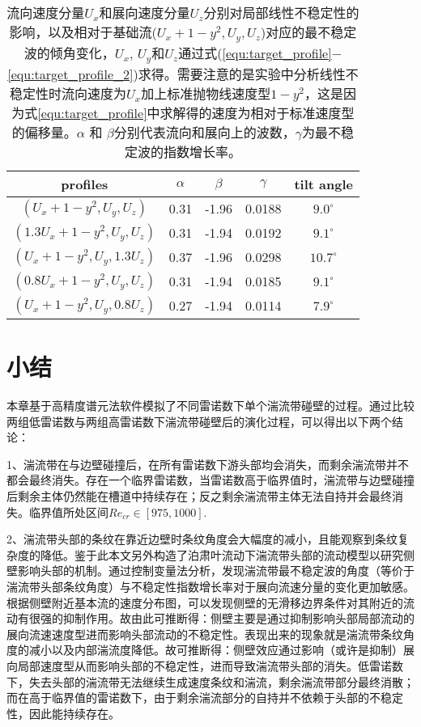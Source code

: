 \begin{table}
\centering
\begin{tabular}{c|c|c|c|c}
\hline
profiles & $\alpha$ & $\beta$ & $\gamma$ & tilt angle \\
\hline
$(U_x+1-y^2, U_y, U_z)$  & 0.31 & -1.96 & 0.0188 & $9.0^\circ$ \\
$(1.3U_x+1-y^2, U_y, U_z)$  & 0.31 & -1.94 & 0.0192 & $9.1^\circ$ \\
$(U_x+1-y^2, U_y, 1.3U_z)$  & 0.37 & -1.96 & 0.0298 & $10.7^\circ$ \\
$(0.8U_x+1-y^2, U_y, U_z)$  & 0.31 & -1.94 & 0.0185 & $9.1^\circ$ \\
$(U_x+1-y^2, U_y, 0.8U_z)$  & 0.27 & -1.94 & 0.0114 & $7.9^\circ$ \\
\hline
\end{tabular}
\caption{\label{tab:stability} 流向速度分量$U_x$和展向速度分量$U_z$分别对局部线性不稳定性的影响，以及相对于基础流($U_x+1-y^2, U_y, U_z$)对应的最不稳定波的倾角变化，$U_x$, $U_y$和$U_z$通过式(\ref{equ:target_profile}$-$\ref{equ:target_profile_2})求得。需要注意的是实验中分析线性不稳定性时流向速度为$U_x$加上标准抛物线速度型$1-y^2$，这是因为式\ref{equ:target_profile}中求解得的速度为相对于标准速度型的偏移量\cite{Song2020}。$\alpha$ 和 $\beta$分别代表流向和展向上的波数，$\gamma$为最不稳定波的指数增长率。{}}
\end{table}

\section{小结}
	本章基于高精度谱元法软件模拟了不同雷诺数下单个湍流带碰壁的过程。通过比较两组低雷诺数与两组高雷诺数下湍流带碰壁后的演化过程，可以得出以下两个结论：

	1、湍流带在与边壁碰撞后，在所有雷诺数下游头部均会消失，而剩余湍流带并不都会最终消失。存在一个临界雷诺数，当雷诺数高于临界值时，湍流带与边壁碰撞后剩余主体仍然能在槽道中持续存在；反之剩余湍流带主体无法自持并会最终消失。临界值所处区间$Re_{cr} \in [975,1000]$.

	2、湍流带头部的条纹在靠近边壁时条纹角度会大幅度的减小，且能观察到条纹复杂度的降低。鉴于此本文另外构造了泊肃叶流动下湍流带头部的流动模型以研究侧壁影响头部的机制。通过控制变量法分析，发现湍流带最不稳定波的角度（等价于湍流带头部条纹角度）与不稳定性指数增长率对于展向流速分量的变化更加敏感。根据侧壁附近基本流的速度分布图，可以发现侧壁的无滑移边界条件对其附近的流动有很强的抑制作用。故由此可推断得：侧壁主要是通过抑制影响头部局部流动的展向流速速度型进而影响头部流动的不稳定性。表现出来的现象就是湍流带条纹角度的减小以及内部湍流度降低。故可推断得：侧壁效应通过影响（或许是抑制）展向局部速度型从而影响头部的不稳定性，进而导致湍流带头部的消失。低雷诺数下，失去头部的湍流带无法继续生成速度条纹和湍流，剩余湍流带部分最终消散；而在高于临界值的雷诺数下，由于剩余湍流部分的自持并不依赖于头部的不稳定性，因此能持续存在。
